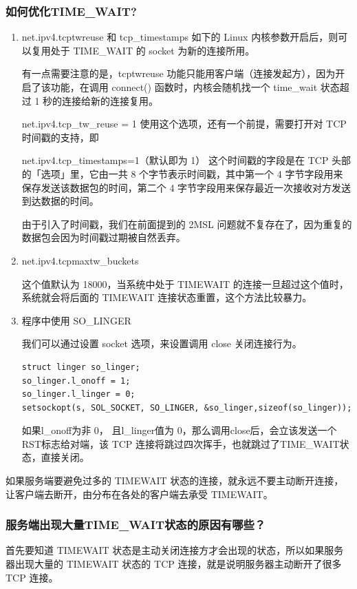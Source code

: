 \documentclass[11pt]{article}
\begin{document}
\subsubsection{如何优化TIME\_WAIT?}
\label{sec:org1c54bc1}
\begin{enumerate}
\item net.ipv4.tcptwreuse 和 tcp\_timestamps
如下的 Linux 内核参数开启后，则可以复用处于 TIME\_WAIT 的 socket 为新的连接所用。

有一点需要注意的是，tcptwreuse 功能只能用客户端（连接发起方），因为开启了该功能，在调用 connect() 函数时，内核会随机找一个 time\_wait 状态超过 1 秒的连接给新的连接复用。

net.ipv4.tcp\_tw\_reuse = 1
使用这个选项，还有一个前提，需要打开对 TCP 时间戳的支持，即

net.ipv4.tcp\_timestamps=1（默认即为 1）
这个时间戳的字段是在 TCP 头部的「选项」里，它由一共 8 个字节表示时间戳，其中第一个 4 字节字段用来保存发送该数据包的时间，第二个 4 字节字段用来保存最近一次接收对方发送到达数据的时间。

由于引入了时间戳，我们在前面提到的 2MSL 问题就不复存在了，因为重复的数据包会因为时间戳过期被自然丢弃。

\item net.ipv4.tcpmaxtw\_buckets

这个值默认为 18000，当系统中处于 TIMEWAIT 的连接一旦超过这个值时，系统就会将后面的 TIMEWAIT 连接状态重置，这个方法比较暴力。

\item 程序中使用 SO\_LINGER

我们可以通过设置 socket 选项，来设置调用 close 关闭连接行为。
\begin{verbatim}
struct linger so_linger;
so_linger.l_onoff = 1;
so_linger.l_linger = 0;
setsockopt(s, SOL_SOCKET, SO_LINGER, &so_linger,sizeof(so_linger));
\end{verbatim}
如果l\_onoff为非 0， 且l\_linger值为 0，那么调用close后，会立该发送一个RST标志给对端，该 TCP 连接将跳过四次挥手，也就跳过了TIME\_WAIT状态，直接关闭。
\end{enumerate}


如果服务端要避免过多的 TIMEWAIT 状态的连接，就永远不要主动断开连接，让客户端去断开，由分布在各处的客户端去承受 TIMEWAIT。
\subsubsection{服务端出现大量TIME\_WAIT状态的原因有哪些？}
\label{sec:org6072b90}
首先要知道 TIMEWAIT 状态是主动关闭连接方才会出现的状态，所以如果服务器出现大量的 TIMEWAIT 状态的 TCP 连接，就是说明服务器主动断开了很多 TCP 连接。
\end{document}
